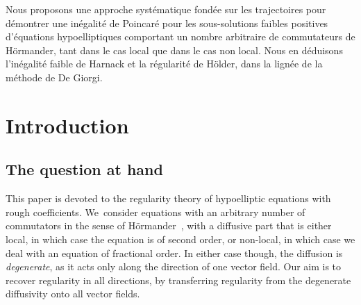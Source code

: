 \documentclass[JEP,XML,SOM,Unicode,NoFloatCountersInSection,published]{cedram}
\theoremstyle{definition}
\begin{document}




\begin{altabstract}
Nous proposons une approche systématique fondée sur les trajectoires pour démontrer une inégalité de Poincaré pour les sous-solutions faibles positives d'équations hypoelliptiques comportant un nombre arbitraire de commutateurs de Hörmander, tant dans le cas local que dans le cas non local. Nous en déduisons l'inégalité faible de Harnack et la régularité de Hölder, dans la lignée de la méthode de De Giorgi.
\end{altabstract}

\maketitle

\tableofcontents
\mainmatter

\section{Introduction}
\label{sec:intro}

\subsection{The question at hand}

This paper is devoted to the regularity theory of hypoelliptic
equations with rough coefficients. We~consider equations with an
arbitrary number of commutators in the sense of Hörmander~\cite{MR0222474},
with a diffusive part that is either local, in which case the equation is of second order,
or non-local, in which case we deal with an equation of fractional order. In either case though,
the diffusion is \textit{degenerate}, as it acts only along the direction of one vector field.
Our aim is to recover regularity in all directions, by transferring regularity from the degenerate diffusivity onto
all vector fields.
\end{document}
